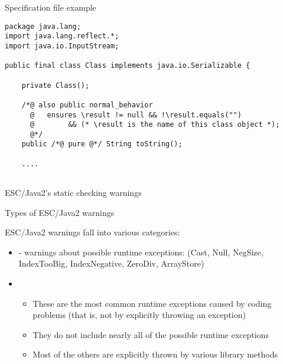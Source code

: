 \documentclass[
pdf,
nocolorBG,
slideColor,
cok,
]{prosper}
\newcommand{\bsl}{\char'134}
\newcommand{\result}{\bsl result}
\begin{document}
\begin{slide}{Specification file example}
\vspace*{-6ex}
\tiny
\begin{verbatim}
package java.lang;
import java.lang.reflect.*;
import java.io.InputStream;

public final class Class implements java.io.Serializable {

    private Class();

    /*@ also public normal_behavior
      @   ensures \result != null && !\result.equals("")
      @        && (* \result is the name of this class object *);
      @*/
    public /*@ pure @*/ String toString();

    ....


\end{verbatim}
\end{slide}


\begin{slide}{}

\vspace*{0ex}
\begin{center}{\large \red ESC/Java2's static checking warnings}\end{center}
\end{slide}




\begin{slide}{Types of ESC/Java2 warnings}
\vspace*{-6ex}

ESC/Java2 warnings fall into various categories:
\begin{itemize}
\item[] - warnings about possible {\knalblue runtime exceptions}:
(Cast, Null, NegSize, IndexTooBig, IndexNegative, ZeroDiv, ArrayStore)
\item[]
\begin{itemize}
\item These are the most common runtime exceptions caused by coding problems (that is, not by 
explicitly throwing an exception)
\item They do not include nearly all of the possible runtime exceptions
\item Most of the others are explicitly thrown by various library methods
\end{itemize}
\end{itemize}
\end{slide}
\end{document}
